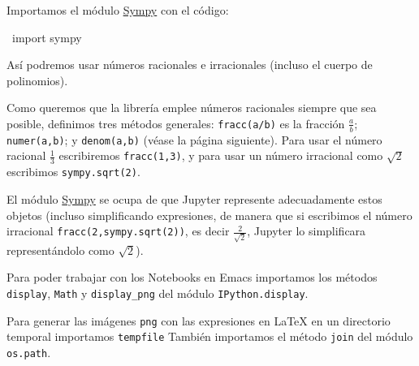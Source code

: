 \documentclass[11pt]{report}
\begin{document}
Importamos el módulo \href{https://www.sympy.org/en/index.html}{Sympy} con el código:
\begin{center}
~import sympy~
\end{center}
Así podremos usar números racionales e irracionales (incluso el cuerpo
de polinomios). 

Como queremos que la librería emplee números racionales siempre que
sea posible, definimos tres métodos generales: \texttt{fracc(a/b)} es la
fracción \(\frac{a}{b}\); \texttt{numer(a,b)}; y \texttt{denom(a,b)} (véase la página
siguiente). Para usar el número racional \(\frac{1}{3}\) escribiremos
\texttt{fracc(1,3)}, y para usar un número irracional como \(\sqrt{2}\)
escribimos \texttt{sympy.sqrt(2)}. 

El módulo \href{https://www.sympy.org/en/index.html}{Sympy} se ocupa de que Jupyter represente adecuadamente estos
objetos (incluso simplificando expresiones, de manera que si
escribimos el número irracional \texttt{fracc(2,sympy.sqrt(2))}, es decir
\(\frac{2}{\sqrt{2}}\), Jupyter lo simplificara representándolo como
\(\sqrt{2}\)).

Para poder trabajar con los Notebooks en Emacs importamos los métodos
\texttt{display}, \texttt{Math} y \texttt{display\_png} del módulo \texttt{IPython.display}.

Para generar las imágenes \texttt{png} con las expresiones en \LaTeX{} en un
directorio temporal importamos \texttt{tempfile}
También importamos el método \texttt{join} del módulo \texttt{os.path}.
\end{document}
